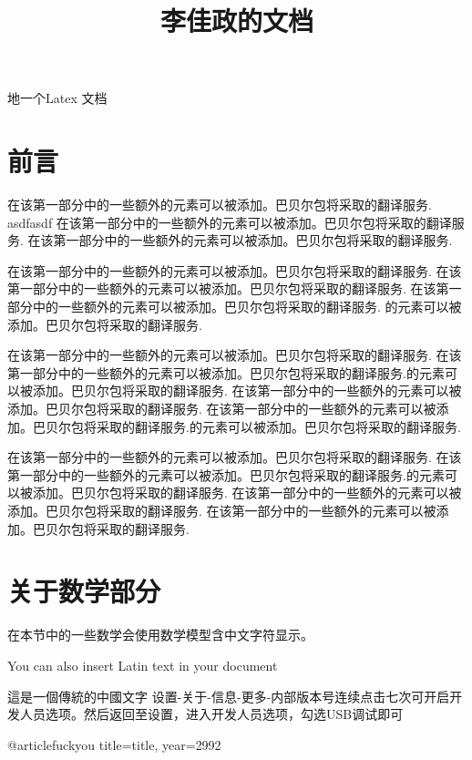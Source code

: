 \documentclass{article}
\begin{document}
\begin{CJK*}{UTF8}{gbsn}
    \title{李佳政的文档}

\begin{titlepage}
    地一个Latex 文档
\end{titlepage}
\section{前言}
在该第一部分中的一些额外的元素可以被添加。巴贝尔包将采取的翻译服务.
asdfasdf\newline
在该第一部分中的一些额外的元素可以被添加。巴贝尔包将采取的翻译服务.
在该第一部分中的一些额外的元素可以被添加。巴贝尔包将采取的翻译服务.

在该第一部分中的一些额外的元素可以被添加。巴贝尔包将采取的翻译服务.
在该第一部分中的一些额外的元素可以被添加。巴贝尔包将采取的翻译服务.
在该第一部分中的一些额外的元素可以被添加。巴贝尔包将采取的翻译服务.
的元素可以被添加。巴贝尔包将采取的翻译服务.\par
在该第一部分中的一些额外的元素可以被添加。巴贝尔包将采取的翻译服务.
在该第一部分中的一些额外的元素可以被添加。巴贝尔包将采取的翻译服务.的元素可以被添加。巴贝尔包将采取的翻译服务.
\newpage
在该第一部分中的一些额外的元素可以被添加。巴贝尔包将采取的翻译服务.
在该第一部分中的一些额外的元素可以被添加。巴贝尔包将采取的翻译服务.的元素可以被添加。巴贝尔包将采取的翻译服务.

在该第一部分中的一些额外的元素可以被添加。巴贝尔包将采取的翻译服务.
在该第一部分中的一些额外的元素可以被添加。巴贝尔包将采取的翻译服务.的元素可以被添加。巴贝尔包将采取的翻译服务.
在该第一部分中的一些额外的元素可以被添加。巴贝尔包将采取的翻译服务.
在该第一部分中的一些额外的元素可以被添加。巴贝尔包将采取的翻译服务.
    
\section{关于数学部分}
在本节中的一些数学会使用数学模型含中文字符显示。
    
\end{CJK*}
    
\vspace{0.5cm} %
    
\noindent
You can also insert Latin text in your document
    
\vspace{0.5cm}
    
\noindent
\begin{CJK*}{UTF8}{bsmi}
這是一個傳統的中國文字
设置-关于-信息-更多-内部版本号连续点击七次可开启开发人员选项。然后返回至设置，进入开发人员选项，勾选USB调试即可

\end{CJK*}
    
@article{fuckyou
title={title},
year={2992}
}
\end{document}
